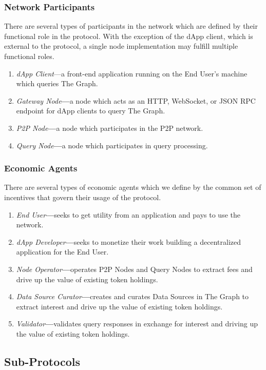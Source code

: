 \documentclass[12pt]{article}
\begin{document}
\subsubsection*{Network Participants}
There are several types of participants in the network which are defined by their functional role in the protocol. With the exception of the dApp client, which is external to the protocol, a single node implementation may fulfill multiple functional roles.
\begin{enumerate}
\item \textit{dApp Client}---a front-end application running on the End User's machine which queries The Graph.
\item \textit{Gateway Node}\textbf{---}a node which acts as an HTTP, WebSocket, or JSON RPC endpoint for dApp clients to query The Graph.
\item \textit{P2P Node}\textbf{---}a node which participates in the P2P network.
\item \textit{Query Node}\textbf{---}a node which participates in query processing.
\end{enumerate}
\subsubsection*{Economic Agents}
There are several types of economic agents which we define by the common set of incentives that govern their usage of the protocol.
\begin{enumerate}
\item \textit{End User}\textbf{---}seeks to get utility from an application and pays to use the network.
\item \textit{dApp Developer}\textbf{---}seeks to monetize their work building a decentralized application for the End User.
\item \textit{Node Operator}\textbf{---}operates P2P Nodes and Query Nodes to extract fees and drive up the value of existing token holdings.
\item \textit{Data Source Curator}\textbf{---}creates and curates Data Sources in The Graph to extract interest and drive up the value of existing token holdings.
\item \textit{Validator}\textbf{---}validates query responses in exchange for interest and driving up the value of existing token holdings.
\end{enumerate}
\subsection{Sub-Protocols}
\end{document}
